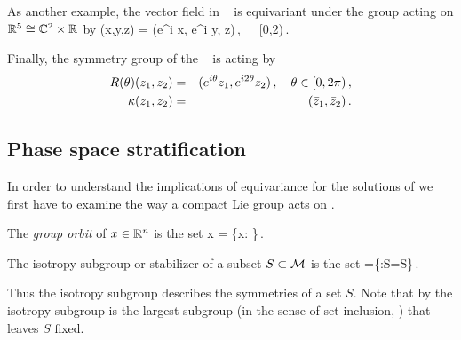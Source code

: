 As another example, the vector field in \CLe\  is equivariant under the group  acting on $\mathbb{R}^{5}\cong \mathbb{C}^{2}\times \mathbb{R}^{}$
by
\beq
 \Rot{\theta} (x,y,z) = (e^{i\theta} x, e^{i\theta} y, z)\,,\ \ \  \theta\in[0,2\pi)\,.
 \label{eq:RotCLe}
\eeq

Finally, the symmetry group of the \AGHe~ is  acting by
\begin{eqnarray*}
  R(\theta)(z_1,z_2) &=& (e^{i\theta} z_1, e^{i 2\theta} z_2)\,,\ \ \  \theta\in[0,2\pi)\,,\\
  \kappa(z_1,z_2) &=& (\bar{z}_1,\bar{z}_2)\,.
\end{eqnarray*}


\subsection{Phase space stratification}
\label{sec:strata}

In order to understand the implications of equivariance for the solutions
of  we first have to examine the way a compact
Lie group acts on .

 The \emph{group orbit} of $x\in\mathbb{R}^{n}$ is the set
\beq
	\Gamma x = \{\gamma x: \gamma\in\Gamma\}\,.
\eeq


\begin{definition}
\label{def:stab}
 The isotropy subgroup or stabilizer of a subset $S\subset \mathcal{M}$ is the set
 \beq
  	=\{\gamma\in\Gamma:\gamma S=S\}\,.
 \eeq
\end{definition}
Thus the isotropy subgroup describes the symmetries of a set $S$. Note that by
 the isotropy subgroup is the largest subgroup (in the
sense of set inclusion, \cf {}) that leaves $S$ fixed.


